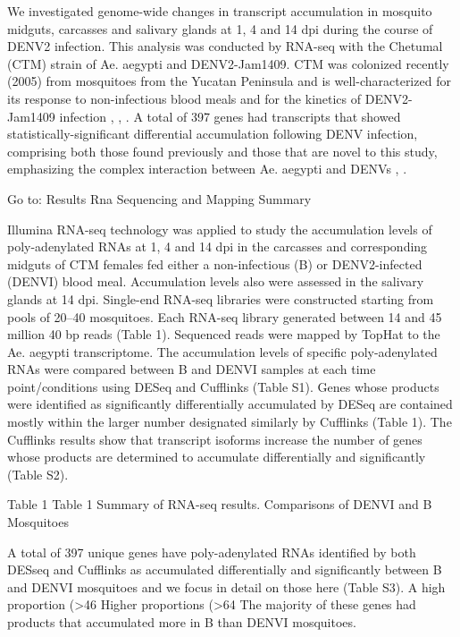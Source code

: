 We investigated genome-wide changes in transcript accumulation in mosquito midguts, carcasses and salivary glands at 1, 4 and 14 dpi during the course of DENV2 infection.
This analysis was conducted by RNA-seq with the Chetumal (CTM) strain of Ae. aegypti and DENV2-Jam1409.
CTM was colonized recently (2005) from mosquitoes from the Yucatan Peninsula and is well-characterized for its response to non-infectious blood meals and for the kinetics of DENV2-Jam1409 infection \cite{Salazar2007}, \cite{Bernhardt2012}, \cite{bonizzoni2012strain}.
A total of 397 genes had transcripts that showed statistically-significant differential accumulation following DENV infection, comprising both those found previously and those that are novel to this study, emphasizing the complex interaction between Ae. aegypti and DENVs \cite{Xi2008}, \cite{Sim2010}\cite{Tchankouo-Nguetcheu2010}\cite{Luplertlop2011}\cite{Behura2011}\cite{Sim2012}\cite{Colpitts2011}.



Go to:
Results
Rna Sequencing and Mapping Summary

Illumina RNA-seq technology was applied to study the accumulation levels of poly-adenylated RNAs at 1, 4 and 14 dpi in the carcasses and corresponding midguts of CTM females fed either a non-infectious (B) or DENV2-infected (DENVI) blood meal.
Accumulation levels also were assessed in the salivary glands at 14 dpi.
Single-end RNA-seq libraries were constructed starting from pools of 20–40 mosquitoes.
Each RNA-seq library generated between 14 and 45 million 40 bp reads (Table 1).
Sequenced reads were mapped by TopHat \cite{Trapnell2009} to the Ae. aegypti transcriptome.
The accumulation levels of specific poly-adenylated RNAs were compared between B and DENVI samples at each time point/conditions using DESeq \cite{Anders2010} and Cufflinks \cite{Trapnell2010} (Table S1).
Genes whose products were identified as significantly differentially accumulated by DESeq are contained mostly within the larger number designated similarly by Cufflinks (Table 1).
The Cufflinks results show that transcript isoforms increase the number of genes whose products are determined to accumulate differentially and significantly (Table S2).

Table 1
Table 1
Summary of RNA-seq results.
Comparisons of DENVI and B Mosquitoes

A total of 397 unique genes have poly-adenylated RNAs identified by both DESseq and Cufflinks as accumulated differentially and significantly between B and DENVI mosquitoes and we focus in detail on those here (Table S3).
A high proportion (>46%
Higher proportions (>64%
The majority of these genes had products that accumulated more in B than DENVI mosquitoes.

